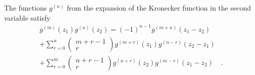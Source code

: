 \begin{theorem}
    The functions $g^{(n)}$ from the expansion of the Kronecker function in the second variable satisfy
    \begin{align}
        g^{(m)}(z_1) g^{(n)}(z_2) = (-1)^{n-1} g^{(m+n)}(z_1-z_2)& \\
         +\sum_{r=0}^n \begin{pmatrix} m+r-1 \\ r \end{pmatrix} g^{(m+r)}(z_1) g^{(n-r)}(z_2-z_1) & \\
         +\sum_{r=0}^m \begin{pmatrix} n+r-1 \\ r \end{pmatrix} g^{(n+r)}(z_2) g^{(m-r)}(z_1-z_2) & .
    \end{align}
\end{theorem}

